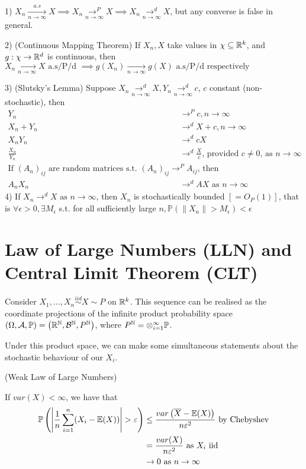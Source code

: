 \documentclass[a4paper]{article}
\begin{document}
\begin{prop}
	1) $X_n \underset{n\to \infty}{\overset{a.s}{\to}} X \implies X_n \underset{n\to \infty}{\to^{P}} X \implies X_n \underset{n\to \infty}{\to^{d}} X$, but any converse is false in general.

	2) (Continuous Mapping Theorem) If $X_n, X$ take values in $\chi \subseteq \mathbb{R}^{k} $, and $g:\chi \to \mathbb{R}^{d}$ is continuous, then $X_n \underset{n\to \infty}{\to} X \text{ a.s/P/d } \implies g(X_n) \underset{n \to  \infty}{\to} g(X) \text{ a.s/P/d respectively} $

	3) (Slutsky's Lemma) Suppose $X_n \underset{n\to \infty}{\to^{d}} X, Y_n \underset{n\to \infty}{\to^{d}} c$,  $c$ constant (non-stochastic), then
	 \begin{align*}
		 Y_n &\to ^{P} c, n\to \infty  \\
		 X_n + Y_n &\to^{d} X + c, n\to \infty  \\
		 X_nY_n &\to^{d} cX \\
		 \frac{X_n}{Y_n} &\to ^{d} \frac{X}{c} \text{, provided $c \neq 0$, as $n\to \infty$ } \\
		 \text{If $(A_n)_{ij}$ are random matrices s.t. $(A_n)_{ij} \to^{P} A_{ij}$, then} \\
		 A_n X_n &\to^{d} AX \text{ as } n\to \infty
	 \end{align*}
	 4) If $X_n \to^{d} X \text{ as } n \to \infty$, then $X_n$ is stochastically bounded $\left[ = O_P(1) \right]$, that is $\forall \epsilon > 0, \exists M_{\epsilon}$ s.t. for all sufficiently large  $n, \mathbb{P}\left( \|X_n\| > M_{\epsilon} \right) < \epsilon$ 

\end{prop}

\section{Law of Large Numbers (LLN) and Central Limit Theorem (CLT)}

Consider $X_1,\ldots,X_n \stackrel{iid}{\sim} X \sim P$ on $\mathbb{R}^{k}$. This sequence can be realised as the coordinate projections of the infinite product probability space $\left( \Omega, \mathcal{A}, \mathbb{P} \right) = \left( \mathbb{R}^{\mathbb{N}}, \mathcal{B}^{\mathbb{N}}, P^{\mathbb{N}} \right)$, where $P^{\mathbb{N}} = \otimes_{i=1}^{\infty} \mathbb{P}$.

Under this product space, we can make some simultaneous statements about the stochastic behaviour of our $X_i$.

\begin{thm}
	(Weak Law of Large Numbers)

	If $var(X) < \infty$, we have that 
	\begin{align*}
		\mathbb{P}\left( \left| \frac{1}{n}\sum_{i=1}^{n} (X_{i} - \mathbb{E}(X)) \right| > \varepsilon \right) &\le \frac{var\left( \overline{X} - \mathbb{E}(X) \right)}{n\varepsilon^2} \text{ by Chebyshev} \\ 
		&= \frac{var(X)}{n\varepsilon^2} \text{ as $X_i$ iid}\\
		&\to 0 \text{ as  } n \to \infty
	\end{align*}
\end{thm}	
\end{document}
